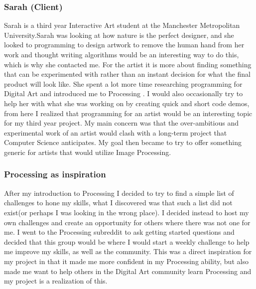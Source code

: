 \documentclass[a4paper]{report}
\begin{document}
\subsubsection{Sarah (Client)}
Sarah is a third year Interactive Art student at the Manchester Metropolitan University.Sarah was looking at how nature is the perfect designer, and she looked to programming to design artwork to remove the human hand from her work and thought writing algorithms would be an interesting way to do this, which is why she contacted me. For the artist it is more about finding something that can be experimented with rather than an instant decision for what the final product will look like. She spent a lot more time researching programming for Digital Art and introduced me to Processing \cite{PROCESSING}. I would also occasionally try to help her with what she was working on by creating quick and short code demos, from here I realized that programming for an artist would be an interesting topic for my third year project. My main concern was that the over-ambitious and experimental work of an artist would clash with a long-term project that Computer Science anticipates. My goal then became to try to offer something generic for artists that would utilize Image Processing. 

\subsubsection{Processing as inspiration}
After my introduction to Processing I decided to try to find a simple list of challenges to hone my skills, what I discovered was that such a list did not exist(or perhaps I was looking in the wrong place). I decided instead to host my own challenges and create an opportunity for others where there was not one for me. I went to the Processing subreddit\cite{RPROCESSING} to ask getting started questions and decided that this group would be where I would start a weekly challenge to help me improve my skills, as well as the community. This was a direct inspiration for my project in that it made me more confident in my Processing ability, but also made me want to help others in the Digital Art community learn Processing and my project is a realization of this.
\end{document}
